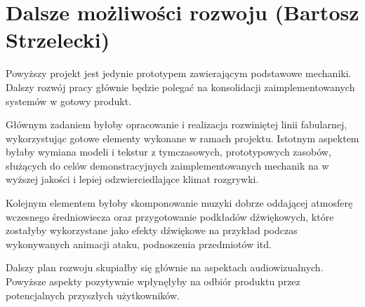 \section{Dalsze możliwości rozwoju (Bartosz Strzelecki)}
Powyższy projekt jest jedynie prototypem zawierającym podstawowe mechaniki.
Dalszy rozwój pracy głównie będzie polegać na konsolidacji zaimplementowanych
systemów w gotowy produkt.

Głównym zadaniem byłoby opracowanie i realizacja rozwiniętej linii fabularnej,
wykorzystując gotowe elementy wykonane w ramach projektu. Istotnym aspektem
byłaby wymiana  modeli i tekstur z tymczasowych, prototypowych zasobów, służących
do celów demonstracyjnych zaimplementowanych mechanik na w wyższej jakości
i lepiej odzwierciedlające klimat rozgrywki.

Kolejnym elementem byłoby skomponowanie muzyki dobrze oddającej atmosferę wczesnego
średniowiecza oraz przygotowanie podkładów dźwiękowych, które zostałyby wykorzystane
jako efekty dźwiękowe na przykład podczas wykonywanych animacji ataku, podnoszenia przedmiotów itd.

Dalszy plan rozwoju skupiałby się głównie na aspektach audiowizualnych.
Powyższe aspekty pozytywnie wpłynęłyby na odbiór produktu przez potencjalnych przyszłych
użytkowników. 
